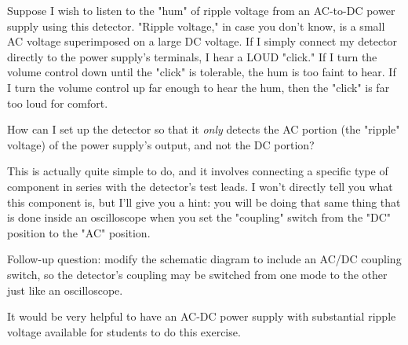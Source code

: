 

Suppose I wish to listen to the "hum" of ripple voltage from an AC-to-DC power supply using this detector.  "Ripple voltage," in case you don't know, is a small AC voltage superimposed on a large DC voltage.  If I simply connect my detector directly to the power supply's terminals, I hear a LOUD "click."  If I turn the volume control down until the "click" is tolerable, the hum is too faint to hear.  If I turn the volume control up far enough to hear the hum, then the "click" is far too loud for comfort.

How can I set up the detector so that it {\it only} detects the AC portion (the "ripple" voltage) of the power supply's output, and not the DC portion?







This is actually quite simple to do, and it involves connecting a specific type of component in series with the detector's test leads.  I won't directly tell you what this component is, but I'll give you a hint: you will be doing that same thing that is done inside an oscilloscope when you set the "coupling" switch from the "DC" position to the "AC" position.

\vskip 10pt

Follow-up question: modify the schematic diagram to include an AC/DC coupling switch, so the detector's coupling may be switched from one mode to the other just like an oscilloscope.







It would be very helpful to have an AC-DC power supply with substantial ripple voltage available for students to do this exercise.



